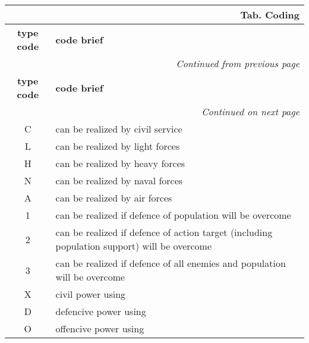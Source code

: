 \documentclass[a4paper,oneside,titlepage]{report}
\newcommand*{\LTHeaderII}[3]{
  \multicolumn{2}{r}{\textbf{Tab. \thesubsection} \textbf{#1}}\\    
  \hline
  \textbf{#2} & \textbf{#3}\\
  \hline

  \endfirsthead
  \multicolumn{2}{r}{\textit{Continued from previous page}}\\    
  \hline
  \textbf{#2} & \textbf{#3}\\
  \hline
  \endhead
  \hline
  \multicolumn{2}{r}{\textit{Continued on next page}}\\
  \endfoot
  \hline
  \endlastfoot  
}
\begin{document}
\vspace{-0.5cm}
\begin{longtable}{ |c|l| } 
  \LTHeaderII{Coding}{type code}{code brief} 
  C & can be realized by civil service \\
  L & can be realized by light forces \\
  H & can be realized by heavy forces \\
  N & can be realized by naval forces \\
  A & can be realized by air forces \\
  \hline
  1 & can be realized if defence of population will be overcome\\
  2 & can be realized if defence of action target (including population support) will be overcome\\
  3 & can be realized if defence of all enemies and population will be overcome\\
  \hline
  X & civil power using\\
  D & defencive power using\\
  O & offencive power using\\
\end{longtable}
\end{document}
